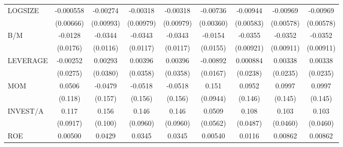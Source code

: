 \begin{table}[htbp]
\begin{tabular}{l*{8}{c}}
LOGSIZE             &   -0.000558         &    -0.00274         &    -0.00318         &    -0.00318         &    -0.00736\sym{**} &    -0.00944         &    -0.00969         &    -0.00969         \\
                    &   (0.00666)         &   (0.00993)         &   (0.00979)         &   (0.00979)         &   (0.00360)         &   (0.00583)         &   (0.00578)         &   (0.00578)         \\
B/M                 &     -0.0128         &     -0.0344\sym{***}&     -0.0343\sym{***}&     -0.0343\sym{***}&     -0.0154         &     -0.0355\sym{***}&     -0.0352\sym{***}&     -0.0352\sym{***}\\
                    &    (0.0176)         &    (0.0116)         &    (0.0117)         &    (0.0117)         &    (0.0155)         &   (0.00921)         &   (0.00911)         &   (0.00911)         \\
LEVERAGE            &    -0.00252         &     0.00293         &     0.00396         &     0.00396         &    -0.00892         &    0.000884         &     0.00338         &     0.00338         \\
                    &    (0.0275)         &    (0.0380)         &    (0.0358)         &    (0.0358)         &    (0.0167)         &    (0.0238)         &    (0.0235)         &    (0.0235)         \\
MOM                 &      0.0506         &     -0.0479         &     -0.0518         &     -0.0518         &       0.151         &      0.0952         &      0.0997         &      0.0997         \\
                    &     (0.118)         &     (0.157)         &     (0.156)         &     (0.156)         &    (0.0944)         &     (0.146)         &     (0.145)         &     (0.145)         \\
INVEST/A            &       0.117         &       0.156         &       0.146         &       0.146         &      0.0509         &       0.108\sym{**} &       0.103\sym{**} &       0.103\sym{**} \\
                    &    (0.0917)         &     (0.100)         &    (0.0960)         &    (0.0960)         &    (0.0562)         &    (0.0487)         &    (0.0460)         &    (0.0460)         \\
ROE                 &     0.00500         &      0.0429         &      0.0345         &      0.0345         &     0.00540         &      0.0116         &     0.00862         &     0.00862         \\

\end{tabular}
\end{table}
